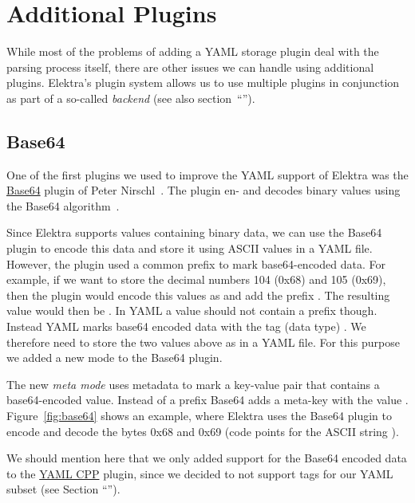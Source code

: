 \section{Additional Plugins}

While most of the problems of adding a YAML storage plugin deal with the parsing process itself, there are other issues we can handle using additional plugins. Elektra’s plugin system allows us to use multiple plugins in conjunction as part of a so-called \emph{backend} (see also section~“”).

\subsection{Base64}
\label{sec:base64}

One of the first plugins we used to improve the YAML support of Elektra was the \href{https://www.libelektra.org/plugins/base64}{Base64} plugin of Peter Nirschl~\cite{nirschl2018crypto}. The plugin en- and decodes binary values using the Base64 algorithm~\cite{josefsson2006base16}.

Since Elektra supports values containing binary data, we can use the Base64 plugin to encode this data and store it using ASCII values in a YAML file. However, the plugin used a common prefix to mark base64-encoded data. For example, if we want to store the decimal numbers 104 (0x68) and 105 (0x69), then the plugin would encode this values as  and add the prefix . The resulting value would then be . In YAML a value should not contain a prefix though. Instead YAML marks base64 encoded data with the tag (data type) . We therefore need to store the two values above as  in a YAML file. For this purpose we added a new mode to the Base64 plugin.

The new \emph{meta mode} uses metadata to mark a key-value pair that contains a base64-encoded value. Instead of a prefix Base64 adds a meta-key  with the value . Figure~\ref{fig:base64} shows an example, where Elektra uses the Base64 plugin to encode and decode the bytes 0x68 and 0x69 (code points for the ASCII string ).

We should mention here that we only added support for the Base64 encoded data to the \href{https://www.libelektra.org/plugins/yamlcpp}{YAML CPP} plugin, since we decided to not support tags for our YAML subset (see Section “”).

